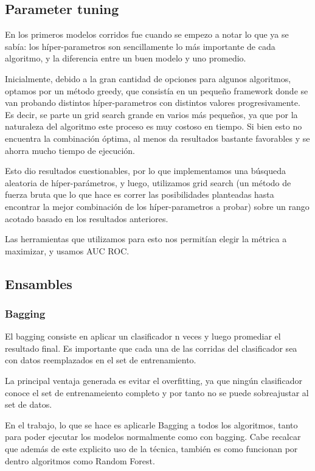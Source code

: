 \documentclass[a4paper]{article}
\begin{document}
\subsection{Parameter tuning}

En los primeros modelos corridos fue cuando se empezo a notar lo que ya se sabía: los híper-parametros son sencillamente lo más importante de cada algoritmo, y la diferencia entre un buen modelo y uno promedio.

Inicialmente, debido a la gran cantidad de opciones para algunos algoritmos, optamos por un método greedy, que consistía en un pequeño framework donde se van probando distintos híper-parametros con distintos valores progresivamente. Es decir, se parte un grid search grande en varios más pequeños, ya que por la naturaleza del algoritmo este proceso es muy costoso en tiempo. Si bien esto no encuentra la combinación óptima, al menos da resultados bastante favorables y se ahorra mucho tiempo de ejecución.

Esto dio resultados cuestionables, por lo que implementamos una búsqueda aleatoria de híper-parámetros, y luego, utilizamos grid search (un método de fuerza bruta que lo que hace es correr las posibilidades planteadas hasta encontrar la mejor combinación de los híper-parametros a probar) sobre un rango acotado basado en los resultados anteriores.

Las herramientas que utilizamos para esto nos permitían elegir la métrica a maximizar, y usamos AUC ROC.

\subsection{Ensambles}

\subsubsection{Bagging}

El bagging consiste en aplicar un clasificador n veces y luego promediar el resultado final. Es importante que cada una de las corridas del clasificador sea con datos reemplazados en el set de entrenamiento.

La principal ventaja generada es evitar el overfitting, ya que ningún clasificador conoce el set de entrenameiento completo y por tanto no se puede sobreajustar al set de datos.

En el trabajo, lo que se hace es aplicarle Bagging a todos los algoritmos, tanto para poder ejecutar los modelos normalmente como con bagging. Cabe recalcar que además de este explicito uso de la técnica, también es como funcionan por dentro algoritmos como Random Forest.
\end{document}
